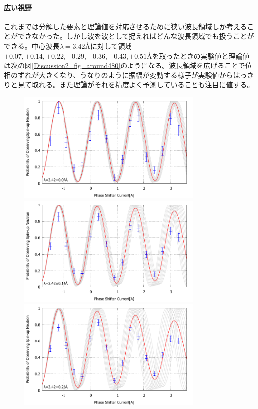 \paragraph{広い視野}
これまでは分解した要素と理論値を対応させるために狭い波長領域しか考えることができなかった。しかし波を波として捉えればどんな波長領域でも扱うことができる。中心波長$\lambda=3.42$\AA に対して領域$\pm 0.07,\pm0.14,\pm0.22,\pm0.29,\pm0.36,\pm0.43,\pm0.51$\AA を取ったときの実験値と理論値は次の図\ref{Discussion2_fig_around480}のようになる。波長領域を広げることで位相のずれが大きくなり、うなりのように振幅が変動する様子が実験値からはっきりと見て取れる。また理論がそれを精度よく予測していることも注目に値する。
\begin{figure}[H]
\centering
\includegraphics[width=9cm]{discussion/SEA/IT_480_10.pdf}
\includegraphics[width=9cm]{discussion/SEA/IT_480_20.pdf}
\includegraphics[width=9cm]{discussion/SEA/IT_480_30.pdf}

\end{figure}
